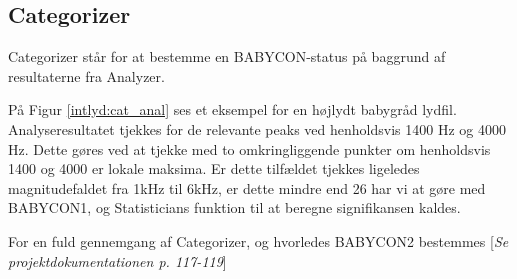\subsection{Categorizer}
Categorizer står for at bestemme en BABYCON-status på baggrund af resultaterne fra Analyzer. 

På Figur \ref{intlyd:cat_anal} ses et eksempel for en højlydt babygråd lydfil. Analyseresultatet tjekkes for de relevante peaks ved henholdsvis 1400 Hz og 4000 Hz. Dette gøres ved at tjekke med to omkringliggende punkter om henholdsvis 1400 og 4000 er lokale maksima. Er dette tilfældet tjekkes ligeledes magnitudefaldet fra 1kHz til 6kHz, er dette mindre end 26 har vi at gøre med BABYCON1, og Statisticians funktion til at beregne signifikansen kaldes.  


For en fuld gennemgang af Categorizer, og hvorledes BABYCON2 bestemmes [\textit{Se projektdokumentationen p. 117-119}]
